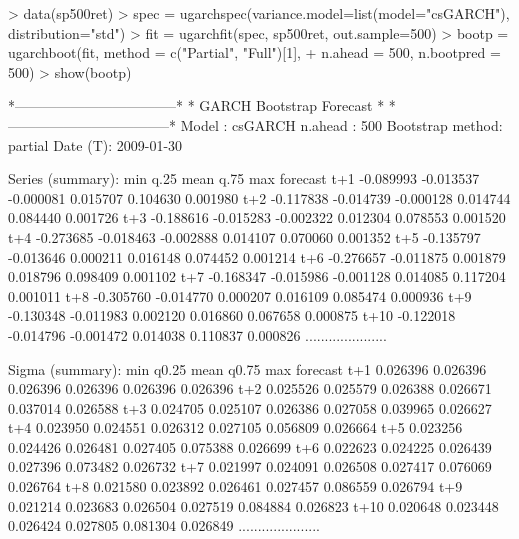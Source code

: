 \begin{Schunk}
\begin{Sinput}
> data(sp500ret)
> spec = ugarchspec(variance.model=list(model="csGARCH"), distribution="std")
> fit = ugarchfit(spec, sp500ret, out.sample=500)
> bootp = ugarchboot(fit, method = c("Partial", "Full")[1],
+ n.ahead = 500, n.bootpred = 500)
> show(bootp)
\end{Sinput}
\begin{Soutput}
*-----------------------------------*
*     GARCH Bootstrap Forecast      *
*-----------------------------------*
Model : csGARCH
n.ahead : 500
Bootstrap method:  partial
Date (T): 2009-01-30

Series (summary):
           min      q.25      mean     q.75      max forecast
t+1  -0.089993 -0.013537 -0.000081 0.015707 0.104630 0.001980
t+2  -0.117838 -0.014739 -0.000128 0.014744 0.084440 0.001726
t+3  -0.188616 -0.015283 -0.002322 0.012304 0.078553 0.001520
t+4  -0.273685 -0.018463 -0.002888 0.014107 0.070060 0.001352
t+5  -0.135797 -0.013646  0.000211 0.016148 0.074452 0.001214
t+6  -0.276657 -0.011875  0.001879 0.018796 0.098409 0.001102
t+7  -0.168347 -0.015986 -0.001128 0.014085 0.117204 0.001011
t+8  -0.305760 -0.014770  0.000207 0.016109 0.085474 0.000936
t+9  -0.130348 -0.011983  0.002120 0.016860 0.067658 0.000875
t+10 -0.122018 -0.014796 -0.001472 0.014038 0.110837 0.000826
.....................

Sigma (summary):
          min    q0.25     mean    q0.75      max forecast
t+1  0.026396 0.026396 0.026396 0.026396 0.026396 0.026396
t+2  0.025526 0.025579 0.026388 0.026671 0.037014 0.026588
t+3  0.024705 0.025107 0.026386 0.027058 0.039965 0.026627
t+4  0.023950 0.024551 0.026312 0.027105 0.056809 0.026664
t+5  0.023256 0.024426 0.026481 0.027405 0.075388 0.026699
t+6  0.022623 0.024225 0.026439 0.027396 0.073482 0.026732
t+7  0.021997 0.024091 0.026508 0.027417 0.076069 0.026764
t+8  0.021580 0.023892 0.026461 0.027457 0.086559 0.026794
t+9  0.021214 0.023683 0.026504 0.027519 0.084884 0.026823
t+10 0.020648 0.023448 0.026424 0.027805 0.081304 0.026849
.....................
\end{Soutput}
\end{Schunk}
